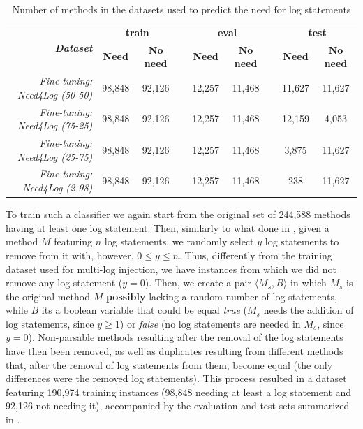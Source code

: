 \begin{table}[h!]
	\centering
	\caption{Number of methods in the datasets used to predict the need for log statements}
	\begin{tabular}{rcccccccc}
		\toprule
		\multirow{2}{*}{\textit{\textbf{Dataset}}} & \multicolumn{2}{c}{\textbf{train}} & \textbf{} & \multicolumn{2}{c}{\textbf{eval}}  & \textbf{} & \multicolumn{2}{c}{\textbf{test}}  \\ \cline{2-3} \cline{5-6} \cline{8-9} 
		& \textbf{Need} & \textbf{No need}   & \textbf{} & \textbf{Need} & \textbf{No need}   & \textbf{} & \textbf{Need} & \textbf{No need}   \\ \midrule
		\textit{Fine-tuning: Need4Log (50-50)}         & 98,848        & 92,126             &           & 12,257        & 11,468             &           & 11,627        &  11,627            \\
		\textit{Fine-tuning: Need4Log (75-25)}         & 98,848        & 92,126             &           & 12,257        & 11,468             &           & 12,159        &  4,053             \\
		\textit{Fine-tuning: Need4Log (25-75)}         & 98,848        & 92,126             &           & 12,257        & 11,468             &           & 3,875         &  11,627            \\ 
		\textit{Fine-tuning: Need4Log (2-98)}         & 98,848        & 92,126             &           & 12,257        & 11,468             &           & 238         &  11,627            \\ 
		\bottomrule
	\end{tabular}
	\label{tab:ds-summary-2}
\end{table}

To train such a classifier we again start from the original set of 244,588 \java methods having at least one log statement. Then, similarly to what done in , given a method $M$ featuring $n$ log statements, we randomly select $y$ log statements to remove from it with, however, $0 \leq y \leq n$. Thus, differently from the training dataset used for multi-log injection, we have instances from which we did not remove any log statement ($y=0$). Then, we create a pair $\langle M_s, B \rangle$ in which $M_s$ is the original method $M$ \textbf{possibly} lacking a random number of log statements, while $B$ its a boolean variable that could be equal \emph{true} (\ie $M_s$ needs the addition of log statements, since $y \geq 1$) or \emph{false} (\ie no log statements are needed in $M_s$, since $y = 0$). Non-parsable methods resulting after the removal of the log statements have then been removed, as well as duplicates resulting from different methods that, after the removal of log statements from them, become equal (\ie the only differences were the removed log statements). This process resulted in a dataset featuring 190,974 training instances (98,848 needing at least a log statement and 92,126 not needing it), accompanied by the evaluation and test sets summarized in .

